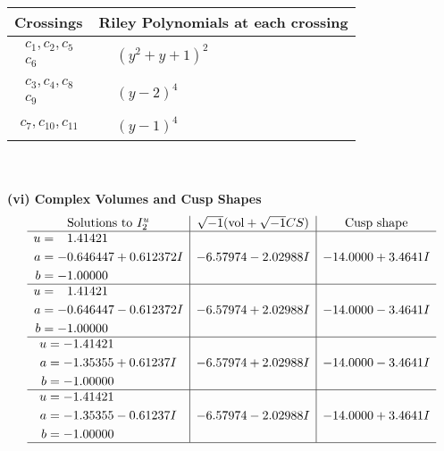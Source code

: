 \documentclass[1p]{elsarticle_modified}
\theoremstyle{definition}
\newcommand{\I}{\sqrt{-1}}
\begin{document}
\begin{tabular}{m{50pt}|m{274pt}}
Crossings & \hspace{64pt}Riley Polynomials at each crossing \\
\hline $$\begin{aligned}c_{1},c_{2},c_{5}\\c_{6}\end{aligned}$$&$\begin{aligned}
&(y^2+y+1)^2
\end{aligned}$\\
\hline $$\begin{aligned}c_{3},c_{4},c_{8}\\c_{9}\end{aligned}$$&$\begin{aligned}
&(y-2)^4
\end{aligned}$\\
\hline $$\begin{aligned}c_{7},c_{10},c_{11}\end{aligned}$$&$\begin{aligned}
&(y-1)^4
\end{aligned}$\\
\hline
\end{tabular}\\~\\
\newpage\flushleft \textbf{(vi) Complex Volumes and Cusp Shapes}
$$\begin{array}{c|c|c}  
\text{Solutions to }I^u_{2}& \I (\text{vol} + \sqrt{-1}CS) & \text{Cusp shape}\\
 \hline 
\begin{aligned}
u &= \phantom{-}1.41421\phantom{ +0.000000I} \\
a &= -0.646447 + 0.612372 I \\
b &= -1.00000\phantom{ +0.000000I}\end{aligned}
 & -6.57974 - 2.02988 I & -14.0000 + 3.4641 I \\ \hline\begin{aligned}
u &= \phantom{-}1.41421\phantom{ +0.000000I} \\
a &= -0.646447 - 0.612372 I \\
b &= -1.00000\phantom{ +0.000000I}\end{aligned}
 & -6.57974 + 2.02988 I & -14.0000 - 3.4641 I \\ \hline\begin{aligned}
u &= -1.41421\phantom{ +0.000000I} \\
a &= -1.35355 + 0.61237 I \\
b &= -1.00000\phantom{ +0.000000I}\end{aligned}
 & -6.57974 + 2.02988 I & -14.0000 - 3.4641 I \\ \hline\begin{aligned}
u &= -1.41421\phantom{ +0.000000I} \\
a &= -1.35355 - 0.61237 I \\
b &= -1.00000\phantom{ +0.000000I}\end{aligned}
 & -6.57974 - 2.02988 I & -14.0000 + 3.4641 I\\
 \hline 
 \end{array}$$\newpage\newpage\renewcommand{\arraystretch}{1}
\end{document}
